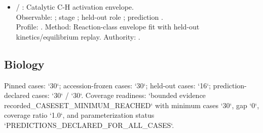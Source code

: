 \begin{itemize}
\item {} / : Catalytic C-H activation envelope.\\ Observable: ; stage ; held-out role ; prediction .\\ Profile: . Method: Reaction-class envelope fit with held-out kinetics/equilibrium replay. Authority: .
\end{itemize}

\subsection{Biology}
Pinned cases: `30`; accession-frozen cases: `30`; held-out cases: `16`; prediction-declared cases: `30` / `30`.
Coverage readiness: `bounded evidence recorded\_CASESET\_MINIMUM\_REACHED` with minimum cases `30`, gap `0`, coverage ratio `1.0`, and parameterization status `PREDICTIONS\_DECLARED\_FOR\_ALL\_CASES`.
